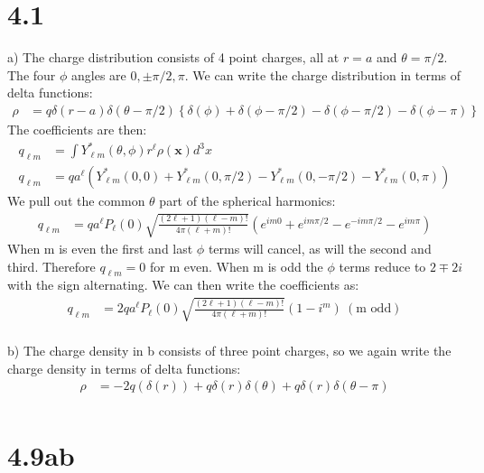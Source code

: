 \documentclass[a4paper,11pt]{article}
\numberwithin{equation}{section}
\newcommand{\bv}[1]{\mathbf{#1}}
\newcommand{\lrp}[1]{\left({#1}\right)}
\newcommand{\lrb}[1]{\left\{{#1}\right\}}
\begin{document}
\section{4.1}
a) The charge distribution consists of 4 point charges, all at $r=a$ and $\theta = \pi/2$.
The four $\phi$ angles are $0, \pm\pi/2, \pi$. 
We can write the charge distribution in terms of delta functions:
\begin{align}
 \rho &= q\delta(r-a)\delta(\theta-\pi/2)\lrb{\delta(\phi)+\delta(\phi-\pi/2)-\delta(\phi-\pi/2)-\delta(\phi-\pi)}
\end{align}
The coefficients are then:
\begin{align}
 q_{\ell m} &= \int Y_{\ell m}^*(\theta,\phi)r^\ell \rho(\bv{x}) d^3x\\
 q_{\ell m} &= qa^\ell \lrp{Y_{\ell m}^*(0,0)+Y_{\ell m}^*(0,\pi/2)-Y_{\ell m}^*(0,-\pi/2)-Y_{\ell m}^*(0,\pi)}
\end{align}
We pull out the common $\theta$ part of the spherical harmonics:
\begin{align}
 q_{\ell m} &= qa^\ell P_\ell(0)\sqrt{ \frac{(2\ell+1)(\ell-m)!}{4\pi(\ell+m)!} } \lrp{e^{im0}+e^{im\pi/2}-e^{-im\pi/2}-e^{im\pi}}
\end{align}
When m is even the first and last $\phi$ terms will cancel, as will the second and third. Therefore $q_{\ell m}=0$ for m even.
When m is odd the $\phi$ terms reduce to $2\mp2i$ with the sign alternating.
We can then write the coefficients as:
\begin{align}
 q_{\ell m} &= 2qa^\ell P_\ell(0)\sqrt{ \frac{(2\ell+1)(\ell-m)!}{4\pi(\ell+m)!} } \lrp{1-i^m}\ (\text{m odd})
\end{align}
\\
b) The charge density in b consists of three point charges, so we again write the charge density in terms of delta functions:
\begin{align}
 \rho &= -2q(\delta(r))+q\delta(r)\delta(\theta)+q\delta(r)\delta(\theta-\pi)\\
\end{align}





\section{4.9ab}
\end{document}
